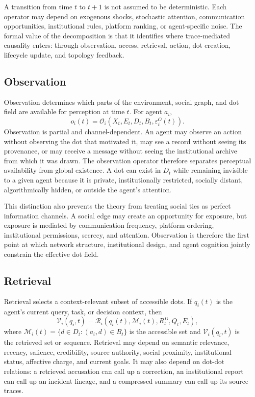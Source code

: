 \documentclass[11pt]{article}
\theoremstyle{remark}
\begin{document}
A transition from time $t$ to $t+1$ is not assumed to be deterministic. Each operator may depend on exogenous shocks, stochastic attention, communication opportunities, institutional rules, platform ranking, or agent-specific noise. The formal value of the decomposition is that it identifies where trace-mediated causality enters: through observation, access, retrieval, action, dot creation, lifecycle update, and topology feedback.

\subsection{Observation}\label{observation}

Observation determines which parts of the environment, social graph, and dot field are available for perception at time $t$. For agent $a_i$,
\[
o_i(t)=\mathcal O_i(X_t,E_t,D_t,B_t,\varepsilon_i^O(t)).
\]
Observation is partial and channel-dependent. An agent may observe an action without observing the dot that motivated it, may see a record without seeing its provenance, or may receive a message without seeing the institutional archive from which it was drawn. The observation operator therefore separates perceptual availability from global existence. A dot can exist in $D_t$ while remaining invisible to a given agent because it is private, institutionally restricted, socially distant, algorithmically hidden, or outside the agent's attention.

This distinction also prevents the theory from treating social ties as perfect information channels. A social edge may create an opportunity for exposure, but exposure is mediated by communication frequency, platform ordering, institutional permissions, secrecy, and attention. Observation is therefore the first point at which network structure, institutional design, and agent cognition jointly constrain the effective dot field.

\subsection{Retrieval}\label{retrieval}

Retrieval selects a context-relevant subset of accessible dots. If $q_i(t)$ is the agent's current query, task, or decision context, then
\[
\mathcal V_i(q_i,t)=\mathcal R_i(q_i(t),\mathcal M_i(t),R_t^D,Q_t,E_t),
\]
where $\mathcal M_i(t)=\{d\in D_t:(a_i,d)\in B_t\}$ is the accessible set and $\mathcal V_i(q_i,t)$ is the retrieved set or sequence. Retrieval may depend on semantic relevance, recency, salience, credibility, source authority, social proximity, institutional status, affective charge, and current goals. It may also depend on dot-dot relations: a retrieved accusation can call up a correction, an institutional report can call up an incident lineage, and a compressed summary can call up its source traces.
\end{document}
